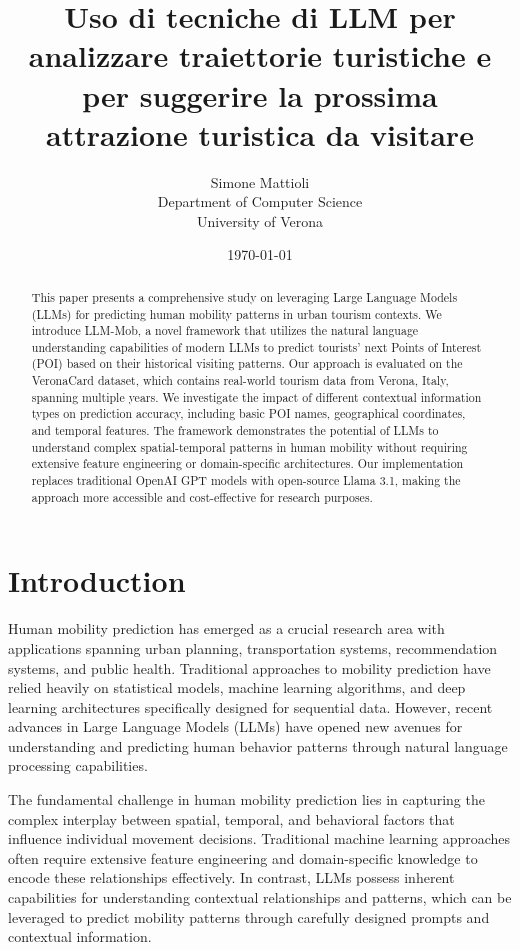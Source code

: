 \documentclass[12pt,a4paper]{article}
\title{Uso di tecniche di LLM per analizzare traiettorie turistiche e per suggerire la prossima attrazione turistica da visitare}
\author{
Simone Mattioli\\
Department of Computer Science\\
University of Verona\\
}
\date{\today}
\begin{document}
\maketitle

\begin{abstract}
This paper presents a comprehensive study on leveraging Large Language Models (LLMs) for predicting human mobility patterns in urban tourism contexts. We introduce LLM-Mob, a novel framework that utilizes the natural language understanding capabilities of modern LLMs to predict tourists' next Points of Interest (POI) based on their historical visiting patterns. Our approach is evaluated on the VeronaCard dataset, which contains real-world tourism data from Verona, Italy, spanning multiple years. We investigate the impact of different contextual information types on prediction accuracy, including basic POI names, geographical coordinates, and temporal features. The framework demonstrates the potential of LLMs to understand complex spatial-temporal patterns in human mobility without requiring extensive feature engineering or domain-specific architectures. Our implementation replaces traditional OpenAI GPT models with open-source Llama 3.1, making the approach more accessible and cost-effective for research purposes.
\end{abstract}

\section{Introduction}

Human mobility prediction has emerged as a crucial research area with applications spanning urban planning, transportation systems, recommendation systems, and public health. Traditional approaches to mobility prediction have relied heavily on statistical models, machine learning algorithms, and deep learning architectures specifically designed for sequential data. However, recent advances in Large Language Models (LLMs) have opened new avenues for understanding and predicting human behavior patterns through natural language processing capabilities.

The fundamental challenge in human mobility prediction lies in capturing the complex interplay between spatial, temporal, and behavioral factors that influence individual movement decisions. Traditional machine learning approaches often require extensive feature engineering and domain-specific knowledge to encode these relationships effectively. In contrast, LLMs possess inherent capabilities for understanding contextual relationships and patterns, which can be leveraged to predict mobility patterns through carefully designed prompts and contextual information.
\end{document}
